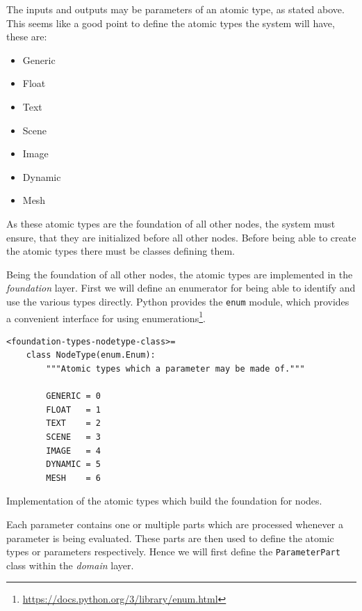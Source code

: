 \documentclass[10pt, openright, notitlepage]{scrreprt}
\begin{document}
The inputs and outputs may be parameters of an atomic type, as stated above. This
seems like a good point to define the atomic types the system will have, these
are:

\begin{itemize}
\item Generic
\item Float
\item Text
\item Scene
\item Image
\item Dynamic
\item Mesh
\end{itemize}

As these atomic types are the foundation of all other nodes, the system must
ensure, that they are initialized before all other nodes. Before being able to
create the atomic types there must be classes defining them.

Being the foundation of all other nodes, the atomic types are implemented in the
\emph{foundation} layer. First we will define an enumerator for being able to
identify and use the various types directly. Python provides the \texttt{enum} module,
which provides a convenient interface for using
enumerations\footnote{\url{https://docs.python.org/3/library/enum.html}}.

\begin{listing}[H]
\begin{verbatim}
<foundation-types-nodetype-class>=
    class NodeType(enum.Enum):
        """Atomic types which a parameter may be made of."""
    
        GENERIC = 0
        FLOAT   = 1
        TEXT    = 2
        SCENE   = 3
        IMAGE   = 4
        DYNAMIC = 5
        MESH    = 6
\end{verbatim}
\caption{\label{lst:foundation-types-nodetype-class}
Implementation of the atomic types which build the foundation for nodes.}
\end{listing}

Each parameter contains one or multiple parts which are processed whenever a
parameter is being evaluated. These parts are then used to define the atomic
types or parameters respectively. Hence we will first define the \texttt{ParameterPart}
class within the \emph{domain} layer.
\end{document}
